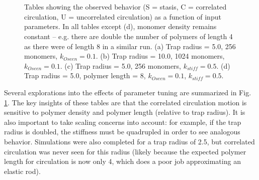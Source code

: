 \documentclass[11pt]{ucthesis}
\begin{document}
\begin{figure}
\centering
{}
\qquad\qquad
{}
\ \\
\ \\
\qquad\qquad\qquad
{}
\caption{Tables showing the observed behavior (S = stasis, C = correlated circulation, U = uncorrelated circulation) as a function of input parameters. In all tables except (d), monomer density remains constant -- e.g. there are double the number of polymers of length 4 as there were of length 8 in a similar run. (a) Trap radius = 5.0, 256 monomers, $k_{Oseen} = 0.1$. (b) Trap radius = 10.0, 1024 monomers, $k_{Oseen} = 0.1$. (c) Trap radius = 5.0, 256 monomers, $k_{stiff} = 0.5$. (d) Trap radius = 5.0, polymer length = 8, $k_{Oseen}=0.1$, $k_{stiff} = 0.5$. \label{fig:categories}}
\end{figure}

Several explorations into the effects of parameter tuning are summarized in Fig. \ref{fig:categories}. The key insights of these tables are that the correlated circulation motion is sensitive to polymer density and polymer length (relative to trap radius). It is also important to take scaling concerns into account: for example, if the trap radius is doubled, the stiffness must be quadrupled in order to see analogous behavior. Simulations were also completed for a trap radius of 2.5, but correlated circulation was never seen for this radius (likely because the expected polymer length for circulation is now only 4, which does a poor job approximating an elastic rod).
\end{document}

